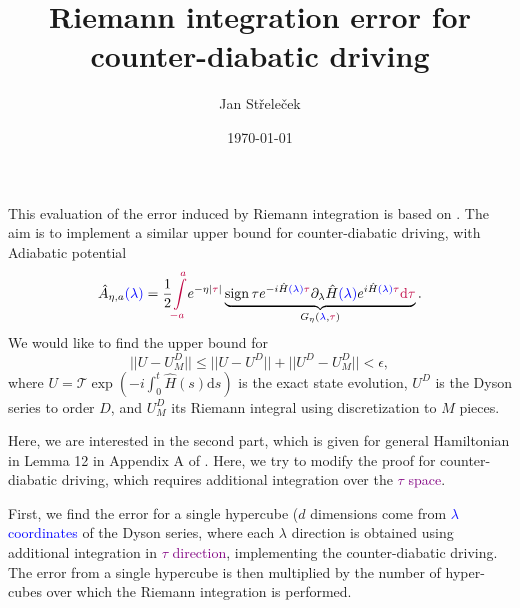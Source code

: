 \documentclass{article}
\title{Riemann integration error for counter-diabatic driving}
\author{Jan Střeleček}
\date{\today}
\DeclareMathOperator{\sign}{sign}
\renewcommand{\d}{\mathrm{d}}
\newcommand{\texp}{\mathcal T \exp}
\newcommand{\blue}[1]{\textcolor{blue}{#1}}
\newcommand{\purple}[1]{\textcolor{purple}{#1}}
\begin{document}
\maketitle
This evaluation of the error induced by Riemann integration is based on \cite{Low2019}. The aim is to implement a similar upper bound for counter-diabatic driving, with Adiabatic potential
\begin{equation}
    \hat A_{\eta,a}\blue{(\lambda)}=\frac{1}{2}\purple{\int\limits_{-a}^a}  e^{-\eta |\purple\tau|}\underbrace{\sign{\tau}e^{-i\hat H\blue{(\lambda)} \purple\tau}\partial_{\lambda}\hat H\blue{(\lambda)} e^{i\hat H \blue{(\lambda)}\purple\tau} \purple{\d \tau}}_{G_\eta(\blue\lambda,\purple\tau)}.
\end{equation}
We would like to find the upper bound for
\begin{equation}
    ||U-U_M^D || \leq ||U-U^D || + ||U^D-U_M^D ||<\epsilon,
\end{equation}
where $U=\texp{(-i\int_0^t \hat H(s) \d s)}$ is the exact state evolution, $U^D$ is the Dyson series to order $D$, and $U_M^D$ its Riemann integral using discretization to $M$ pieces.

Here, we are interested in the second part, which is given for general Hamiltonian in Lemma 12 in Appendix A of \cite{Low2019}. Here, we try to modify the proof for counter-diabatic driving, which requires additional integration over the \purple{$\tau$ space}.

First, we find the error for a single hypercube ($d$ dimensions come from \blue{$\lambda$ coordinates} of the Dyson series, where each $\lambda$ direction is obtained using additional integration in \purple{$\tau$ direction}, implementing the counter-diabatic driving. The error from a single hypercube is then multiplied by the number of hyper-cubes over which the Riemann integration is performed. 
\end{document}
